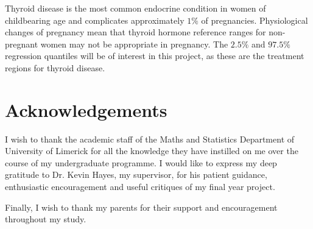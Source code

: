 \documentclass[12pt,a4paper]{report}
\begin{document}
\par\noindent
Thyroid disease is the most common endocrine condition in women of childbearing age and complicates approximately $1\%$ of pregnancies. Physiological changes of pregnancy mean that thyroid hormone reference ranges for non-pregnant women may not be appropriate in pregnancy. The $2.5\%$ and $97.5\%$ regression quantiles will be of interest in this project, as these are the treatment regions for thyroid disease.

\chapter*{Acknowledgements}
I wish to thank the academic staff of the Maths and Statistics Department of University of Limerick for all the knowledge they have instilled on me over the course of my undergraduate programme. I would like to express my deep gratitude to Dr. Kevin Hayes, my supervisor, for his patient guidance, enthusiastic encouragement and useful critiques of my final year project.
\vspace{2mm}
\par\noindent
Finally, I wish to thank my parents for their support and encouragement throughout my study.

\tableofcontents

\clearpage
{}
\end{document}
